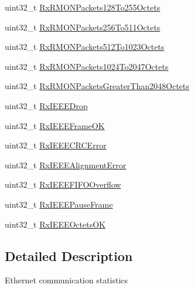 \begin{DoxyCompactItemize}
\item 
uint32\-\_\-t \hyperlink{struct_l_d_d___e_t_h___t_stats_a9f94ff3e005a23752efa4287047d6ad4}{Rx\-R\-M\-O\-N\-Packets128\-To255\-Octets}
\item 
uint32\-\_\-t \hyperlink{struct_l_d_d___e_t_h___t_stats_a2741f585007cbf3e2149a0c3c01cad34}{Rx\-R\-M\-O\-N\-Packets256\-To511\-Octets}
\item 
uint32\-\_\-t \hyperlink{struct_l_d_d___e_t_h___t_stats_a4fcae87a6295a13e04d1f9fbbf8a372f}{Rx\-R\-M\-O\-N\-Packets512\-To1023\-Octets}
\item 
uint32\-\_\-t \hyperlink{struct_l_d_d___e_t_h___t_stats_ae604998c1a18d51b91f7869ce62c8de6}{Rx\-R\-M\-O\-N\-Packets1024\-To2047\-Octets}
\item 
uint32\-\_\-t \hyperlink{struct_l_d_d___e_t_h___t_stats_ac0c12c619019c114aed21822b9ad1f74}{Rx\-R\-M\-O\-N\-Packets\-Greater\-Than2048\-Octets}
\item 
uint32\-\_\-t \hyperlink{struct_l_d_d___e_t_h___t_stats_a15454fa9b998bdf66ce5779db7a0d1bf}{Rx\-I\-E\-E\-E\-Drop}
\item 
uint32\-\_\-t \hyperlink{struct_l_d_d___e_t_h___t_stats_a08daf56845bec3191b018595c4f5133d}{Rx\-I\-E\-E\-E\-Frame\-O\-K}
\item 
uint32\-\_\-t \hyperlink{struct_l_d_d___e_t_h___t_stats_a4cd8c25ab41593bbdd57b7cfb464464e}{Rx\-I\-E\-E\-E\-C\-R\-C\-Error}
\item 
uint32\-\_\-t \hyperlink{struct_l_d_d___e_t_h___t_stats_ac955c4d1539ab834871ba5e12a59c5e9}{Rx\-I\-E\-E\-E\-Alignment\-Error}
\item 
uint32\-\_\-t \hyperlink{struct_l_d_d___e_t_h___t_stats_aab2070c368a056a253d7c731cda82b83}{Rx\-I\-E\-E\-E\-F\-I\-F\-O\-Overflow}
\item 
uint32\-\_\-t \hyperlink{struct_l_d_d___e_t_h___t_stats_a0f3ffac2ae608fc62c15095927e6280f}{Rx\-I\-E\-E\-E\-Pause\-Frame}
\item 
uint32\-\_\-t \hyperlink{struct_l_d_d___e_t_h___t_stats_ad2512d8912b0eb4d6486e72688fba12c}{Rx\-I\-E\-E\-E\-Octets\-O\-K}
\end{DoxyCompactItemize}


\subsection{Detailed Description}
Ethernet communication statistics 

